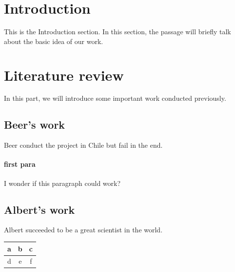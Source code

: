 \documentclass[twocolumn, 12pt, letterpaper, twoside]{article}
\begin{document}
\section{Introduction}
This is the Introduction section. In this section, the passage will briefly talk about the basic idea of our work.

\section{Literature review}
In this part, we will introduce some important work conducted previously.

\subsection{Beer's work}
Beer conduct the project in Chile but fail in the end.
\paragraph{first para}
I wonder if this paragraph could work?

\subsection{Albert's work}
Albert succeeded to be a great scientist in the world.

\begin{center}
    \begin{tabular}{|c| c |c|}
    \hline
    a & b & c \\
    \hline
    d & e & f \\
    \hline
    \end{tabular}
\end{center}
\end{document}
